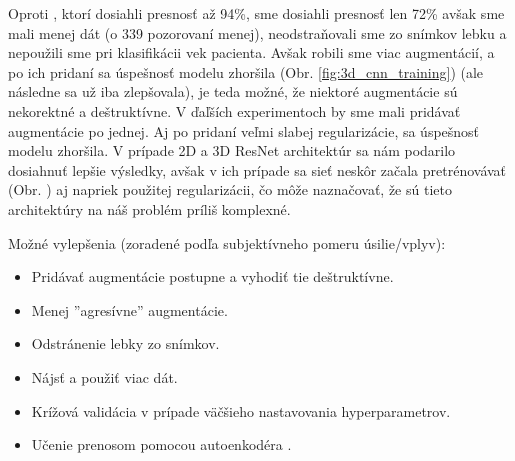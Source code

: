 Oproti \citeauthor*{esmaeilzadeh2018end}, ktorí dosiahli presnosť až 94\%, sme dosiahli presnosť len 72\% avšak sme mali menej dát (o 339 pozorovaní menej), neodstraňovali sme zo snímkov lebku a nepoužili sme pri klasifikácii vek pacienta. Avšak robili sme viac augmentácií, a po ich pridaní sa úspešnosť modelu zhoršila (Obr. \ref{fig:3d_cnn_training}) (ale následne sa už iba zlepšovala), je teda možné, že niektoré augmentácie sú nekorektné a deštruktívne. V ďaľších experimentoch by sme mali pridávať augmentácie po jednej. Aj po pridaní veľmi slabej regularizácie, sa úspešnosť modelu zhoršila. V prípade 2D a 3D ResNet architektúr sa nám podarilo dosiahnuť lepšie výsledky, avšak v ich prípade sa sieť neskôr začala pretrénovávať (Obr. \label{ref:2d_3d_res_net_training}
) aj napriek použitej regularizácii, čo môže naznačovať, že sú tieto architektúry na náš problém príliš komplexné.

Možné vylepšenia (zoradené podľa subjektívneho pomeru úsilie/vplyv):
\begin{itemize}
    \item Pridávať augmentácie postupne a vyhodiť tie deštruktívne.
    \item Menej ''agresívne'' augmentácie.
    \item Odstránenie lebky zo snímkov.
    \item Nájsť a použiť viac dát.
    \item Krížová validácia v prípade väčšieho nastavovania hyperparametrov.
    \item Učenie prenosom pomocou autoenkodéra \cite{hosseini2016alzheimer}.
\end{itemize}

